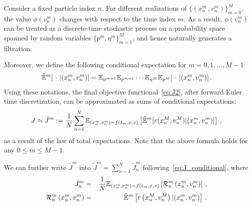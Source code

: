 \documentclass[12pt]{amsart}
\newcommand{\np}{{m+1}}
\begin{document}
Consider a fixed particle index $n$. For different realizations of $\{\left( x_n^m\,,v_n^m \right) \}_{m=0}^{M}$, the value $\phi(v_n^m)$ changes with respect to the time index $m$. As a result, $\phi(v_n^m)$ can be treated as a discrete-time stochastic process on a probability space spanned by random variables $\{p^m,\eta^m\}_{m=1}^M$, and hence naturally generates a filtration. 

Moreover, we define the following conditional expectation for $m = 0,1,\ldots, M-1$
\[
    \tilde\bbE^m[~\cdot~|(x_n^m,v_n^m)] = \bbE_{\eta^\np} \bbE_{p^\np} \cdots \bbE_{\eta^M} \bbE_{p^M}[~\cdot~ | (x_n^m, v_n^m)] \,.
\]
Using these notations, the final objective functional~\eqref{eq:J2}, after forward Euler time discretization, can be approximated as sums of conditional expectations: 
\begin{equation}\label{eq:J_conditional}
    J \approx \tilde{J}^m:=  \frac{1}{N} \sum_{n=1}^N \mathbb{E}_{(x_n^{m},v_n^{m})\sim f(t_m,x,v ) } \left[ \tilde{\mathbb E}^{m} [r(x_n^M,v_n^M)  |(x_n^m,v_n^m)]  \right]\,,
\end{equation}
as a result of the law of total expectations. Note that the above formula holds for any $0\leq m \leq M-1$.

We can further write $\tilde{J}^m$ into $\tilde{J} ^m= \sum_{n=1}^N \tilde{J}^m_n$ following~\eqref{eq:J_conditional}, where
\begin{eqnarray}
\tilde{J}^m_n &=&  \frac{1}{N} \mathbb{E}_{(x_n^{m},v_n^{m})\sim f(t_m,x,v ) } \left[ \mathcal{R}_n^m\left(x_n^m, v_n^m\right)  \right] \, , \label{eq:Ji_conditional} \\
\mathcal{R}_n^m\left(x_n^m, v_n^m\right) &=&  \tilde{\mathbb E}^{m} \left[r\left(x_n^M,v_n^M\right) |(x_n^m,v_n^m) \right] \, . \label{eq:Ri_def}
\end{eqnarray}
\end{document}
